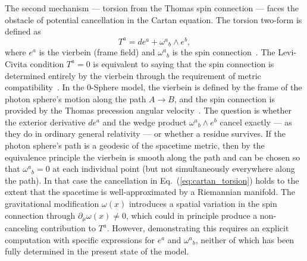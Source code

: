 \documentclass[%
 reprint,
 amsmath,amssymb,
 aps,
 prb,
]{revtex4-2}
\numberwithin{equation}{section}
\newcommand{\omeff}{\omega(x)}
\begin{document}
The second mechanism --- torsion from the Thomas spin connection --- faces the obstacle of potential cancellation in the Cartan equation. The torsion two-form is defined as
\begin{equation}
T^a = de^a + \omega^a{}_b \wedge e^b,
\label{eq:cartan_torsion}
\end{equation}
where $e^a$ is the vierbein (frame field) and $\omega^a{}_b$ is the spin connection~\cite{mtw,nakahara}. The Levi-Civita condition $T^a = 0$ is equivalent to saying that the spin connection is determined entirely by the vierbein through the requirement of metric compatibility~\cite{mtw}. In the 0-Sphere model, the vierbein is defined by the frame of the photon sphere's motion along the path $A\to B$, and the spin connection is provided by the Thomas precession angular velocity~\cite{paper13,paper35}. The question is whether the exterior derivative $de^a$ and the wedge product $\omega^a{}_b \wedge e^b$ cancel exactly --- as they do in ordinary general relativity --- or whether a residue survives. If the photon sphere's path is a geodesic of the spacetime metric, then by the equivalence principle the vierbein is smooth along the path and can be chosen so that $\omega^a{}_b = 0$ at each individual point (but not simultaneously everywhere along the path). In that case the cancellation in Eq.~(\ref{eq:cartan_torsion}) holds to the extent that the spacetime is well-approximated by a Riemannian manifold. The gravitational modification $\omeff$ introduces a spatial variation in the spin connection through $\partial_\mu\omeff \neq 0$, which could in principle produce a non-canceling contribution to $T^a$. However, demonstrating this requires an explicit computation with specific expressions for $e^a$ and $\omega^a{}_b$, neither of which has been fully determined in the present state of the model.
\end{document}
